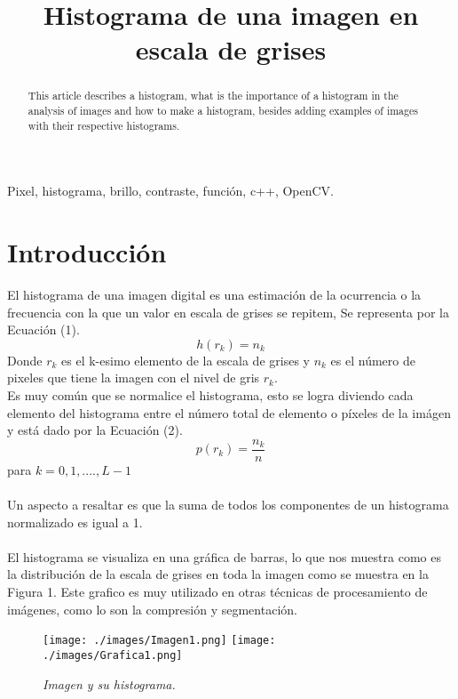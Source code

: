 \documentclass[conference]{IEEEtran}
\begin{document}
\title{ Histograma de una imagen en escala de grises}
\author{
}

\maketitle
\renewcommand\abstractname{Abstract}
\begin{abstract}
This article describes a histogram, what is the importance of a histogram in the analysis of images and how to make a histogram, besides adding examples of images with their respective histograms. \\
\end{abstract}

\begin{IEEEkeywords}
Pixel, histograma, brillo, contraste, funci\'on, c++, OpenCV.
\end{IEEEkeywords}

\IEEEpeerreviewmaketitle
\section{Introducci\'on}
El histograma de una imagen digital es una estimaci\'on de la ocurrencia o la frecuencia con la que un valor en escala de grises se repitem, Se representa por la Ecuaci\'on (1).\\
\begin{equation}
h(r_k) = n_k
\end{equation}
Donde $r_k$ es el k-esimo elemento de la escala de grises y $n_k$ es el n\'umero de pixeles que tiene la imagen con el nivel de gris $r_k$.\\
Es muy com\'un que se normalice el histograma, esto se logra diviendo cada elemento del histograma entre el n\'umero total de elemento o p\'ixeles de la im\'agen y est\'a dado por la Ecuaci\'on (2).
\begin{equation}
p(r_k) = \frac{n_k}{n}
\end{equation}
para $k = 0,1,....,L-1$ \\\\
Un aspecto a resaltar es que la suma de todos los componentes de un histograma normalizado es igual a 1.\\\\
El histograma se visualiza en una gr\'afica de barras, lo que nos muestra como es la distribuci\'on de la escala de grises en toda la imagen como se muestra en la Figura 1. Este grafico es muy utilizado en otras t\'ecnicas de procesamiento de im\'agenes, como lo son la compresi\'on y segmentaci\'on.
\begin{figure}[h]
	\begin{center}
		\setlength{\unitlength}{0.00105in}
		\texttt{[image: ./images/Imagen1.png]}
		\texttt{[image: ./images/Grafica1.png]}
	\end{center}
	\caption{\emph{Imagen y su histograma.}}
\end{figure}
\end{document}

